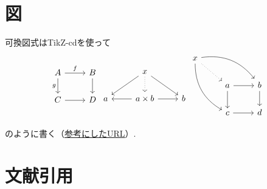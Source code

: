 \documentclass[11pt,a4paper,oneside,lualatex]{ltjsarticle} %
\numberwithin{equation}{section} %
\begin{document}
\section{図} \label{sec:diag}


可換図式はTikZ-cdを使って
\begin{equation}
\begin{tikzcd}
	A \ar[r, "f"] \arrow[d, "g"'] & B \ar[d] \\
	C \ar[r] & D
\end{tikzcd}
\begin{tikzcd}
	& x \arrow[ld] \arrow[d, dotted] \arrow[rd] & \\
	a & a\times b \arrow[l] \arrow[r] & b
\end{tikzcd}
\begin{tikzcd}
	x \arrow[ddr, bend right] \arrow[rrd, bend left] \arrow[rd, dotted] & & \\
	& a \arrow[r] \arrow[d] & b \arrow[d] \\
	& c \arrow[r] & d
\end{tikzcd}
\end{equation}

のように書く（\href{https://blog.miz-ar.info/2017/06/commutative-diagrams-in-latex/}{参考にしたURL}）.

%


\section{文献引用} \label{sec:bib}
\end{document}
